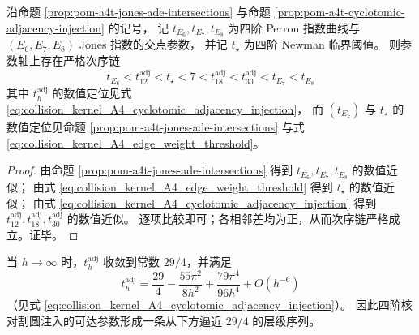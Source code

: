 \begin{corollary}\label{cor:pom-a4t-cyclotomic-adj-ordering-chain}
沿命题 \ref{prop:pom-a4t-jones-ade-intersections} 与命题 \ref{prop:pom-a4t-cyclotomic-adjacency-injection} 的记号，
记 \(t_{E_6},t_{E_7},t_{E_8}\) 为四阶 Perron 指数曲线与 \((E_6,E_7,E_8)\) Jones 指数的交点参数，
并记 \(t_\star\) 为四阶 Newman 临界阈值。
则参数轴上存在严格次序链
\[
\boxed{\;
t_{E_6}
<
t_{12}^{\mathrm{adj}}
<
t_\star
<
7
<
t_{18}^{\mathrm{adj}}
<
t_{30}^{\mathrm{adj}}
<
t_{E_7}
<
t_{E_8}\;}
\]
其中 \(t_h^{\mathrm{adj}}\) 的数值定位见式 \eqref{eq:collision_kernel_A4_cyclotomic_adjacency_injection}，
而 \((t_{E_k})\) 与 \(t_\star\) 的数值定位见命题 \ref{prop:pom-a4t-jones-ade-intersections} 与式 \eqref{eq:collision_kernel_A4_edge_weight_threshold}。
\end{corollary}
\begin{proof}
由命题 \ref{prop:pom-a4t-jones-ade-intersections} 得到 \(t_{E_6},t_{E_7},t_{E_8}\) 的数值近似；
由式 \eqref{eq:collision_kernel_A4_edge_weight_threshold} 得到 \(t_\star\) 的数值近似；
由式 \eqref{eq:collision_kernel_A4_cyclotomic_adjacency_injection} 得到 \(t_{12}^{\mathrm{adj}},t_{18}^{\mathrm{adj}},t_{30}^{\mathrm{adj}}\) 的数值近似。
逐项比较即可；各相邻差均为正，从而次序链严格成立。证毕。
\end{proof}

\begin{remark}\label{rem:pom-a4t-cyclotomic-adj-asymptotic}
当 \(h\to\infty\) 时，\(t_h^{\mathrm{adj}}\) 收敛到常数 \(29/4\)，并满足
\[
t_h^{\mathrm{adj}}
=\frac{29}{4}
-\frac{55\pi^2}{8h^2}
+\frac{79\pi^4}{96h^4}
+O(h^{-6})
\]
（见式 \eqref{eq:collision_kernel_A4_cyclotomic_adjacency_injection}）。
因此四阶核对割圆注入的可达参数形成一条从下方逼近 \(29/4\) 的层级序列。
\end{remark}

